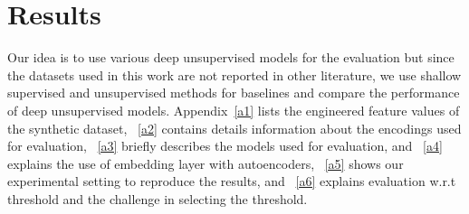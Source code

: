\documentclass{article}
\begin{document}
\section{Results}

Our idea is to use various deep unsupervised models for the evaluation but since the datasets used in this work are not reported in other literature, we use shallow supervised and unsupervised methods for baselines and compare the performance of deep unsupervised models. Appendix~\ref{a1} lists the engineered feature values of the synthetic dataset, ~\ref{a2} contains details information about the encodings used for evaluation, ~\ref{a3} briefly describes the models used for evaluation, and ~\ref{a4} explains the use of embedding layer with autoencoders, ~\ref{a5} shows our experimental setting to reproduce the results, and ~\ref{a6} explains evaluation w.r.t threshold and the challenge in selecting the threshold. 
\end{document}
